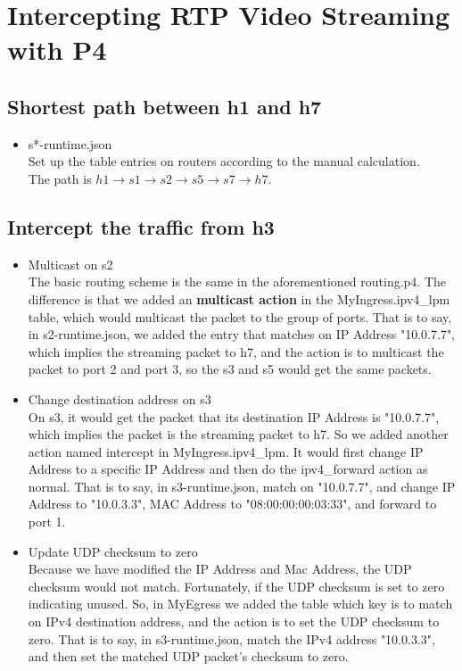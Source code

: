 \documentclass[a4paper,11pt]{article}
\begin{document}
\section{Intercepting RTP Video Streaming with P4}
\subsection{Shortest path between h1 and h7}
    \begin{itemize}
        \item s*-runtime.json \\
        Set up the table entries on routers according to the manual calculation. \\
        The path is $h1 \rightarrow s1 \rightarrow s2 \rightarrow s5 \rightarrow s7 \rightarrow h7$.
    \end{itemize}
\subsection{Intercept the traffic from h3}
    \begin{itemize}
        \item Multicast on s2 \\
        The basic routing scheme is the same in the aforementioned routing.p4.  The difference is that we added an \textbf{multicast action} in the MyIngress.ipv4\_lpm table, which would multicast the packet to the group of ports.  That is to say, in s2-runtime.json, we added the entry that matches on IP Address "10.0.7.7", which implies the streaming packet to h7, and the action is to multicast the packet to port 2 and port 3, so the s3 and s5 would get the same packets.
        \item Change destination address on s3 \\
        On s3, it would get the packet that its destination IP Address is "10.0.7.7", which implies the packet is the streaming packet to h7.  So we added another action named intercept in MyIngress.ipv4\_lpm.  It would first change IP Address to a specific IP Address and then do the ipv4\_forward action as normal.  That is to say, in s3-runtime.json, match on "10.0.7.7", and change IP Address to "10.0.3.3", MAC Address to "08:00:00:00:03:33", and forward to port 1.
        \item Update UDP checksum to zero \\
        Because we have modified the IP Address and Mac Address, the UDP checksum would not match.  Fortunately, if the UDP checksum is set to zero indicating unused.  So, in MyEgress we added the table which key is to match on IPv4 destination address, and the action is to set the UDP checksum to zero.  That is to say, in s3-runtime.json, match the IPv4 address "10.0.3.3", and then set the matched UDP packet's checksum to zero.
    \end{itemize}
\end{document}
